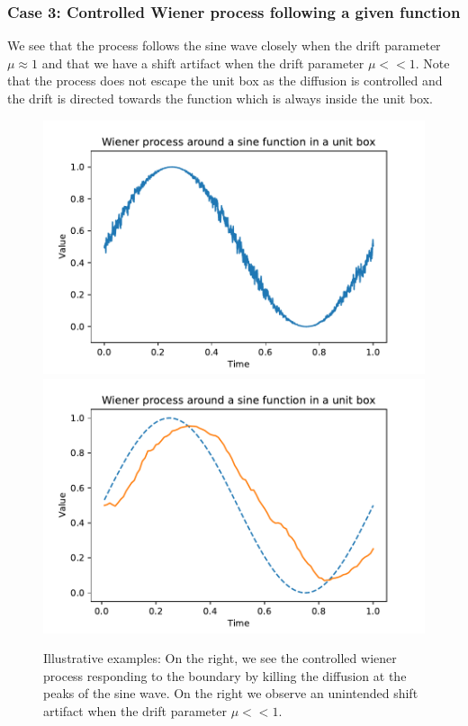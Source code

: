 \documentclass[aspectratio=169]{beamer}\usepackage[utf8]{inputenc}
\begin{document}
{\begin{frame}\frametitle{Case 3: Controlled Wiener process following a given function }
We see that the process follows the sine wave  closely when the  drift parameter $\mu \approx 1$ and that we have a shift artifact when the drift parameter $\mu<<1$. Note that the process does not  escape the unit box as the diffusion is controlled and the drift is directed towards the function which is always inside the unit box.
\begin{figure}
  \includegraphics[scale=0.4]{Figures/Wiener_sine_box.pdf}
   \includegraphics[scale=0.4]{Figures/conv_sine_shift.pdf}
  \caption{Illustrative examples: On the right, we see the controlled wiener process responding to the boundary  by killing the diffusion at the peaks of the sine wave. On the right we observe an unintended  shift artifact when the drift parameter $\mu<<1$.   }
\end{figure}


\end{frame}}
\end{document}
